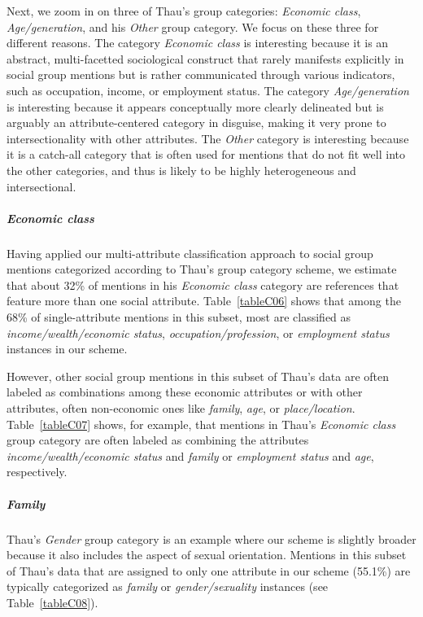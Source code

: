\documentclass[12pt]{article}
\begin{document}
Next, we zoom in on three of Thau's group categories: \emph{Economic class}, \emph{Age/generation}, and his \emph{Other} group category.
We focus on these three for different reasons.
The category \emph{Economic class} is interesting because it is an abstract, multi-facetted sociological construct that rarely manifests explicitly in social group mentions but is rather communicated through various indicators, such as occupation, income, or employment status.
The category \emph{Age/generation} is interesting because it appears conceptually more clearly delineated but is arguably an attribute-centered category in disguise, making it very prone to intersectionality with other attributes.
The \emph{Other} category is interesting because it is a catch-all category that is often used for mentions that do not fit well into the other categories, and thus is likely to be highly heterogeneous and intersectional.

\subparagraph{Economic class}\label{economic-class}

Having applied our multi-attribute classification approach to social group mentions categorized according to Thau's group category scheme, we estimate that about 32\% of mentions in his \emph{Economic class} category are references that feature more than one social attribute.
Table~\ref{tableC06} shows that among the 68\% of single-attribute mentions in this subset, most are classified as \emph{income/wealth/economic status}, \emph{occupation/profession}, or \emph{employment status} instances in our scheme.

%

%

However, other social group mentions in this subset of Thau's data are often labeled as combinations among these economic attributes or with other attributes, often non-economic ones like \emph{family}, \emph{age}, or \emph{place/location}.
Table~\ref{tableC07} shows, for example, that mentions in Thau's \emph{Economic class} group category are often labeled as combining the attributes \emph{income/wealth/economic status} and \emph{family} or \emph{employment status} and \emph{age}, respectively.

\subparagraph{Family}\label{family}

%

Thau's \emph{Gender} group category is an example where our scheme is slightly broader because it also includes the aspect of sexual orientation.
Mentions in this subset of Thau's data that are assigned to only one attribute in our scheme (55.1\%) are typically categorized as \emph{family} or \emph{gender/sexuality} instances (see Table~\ref{tableC08}).
\end{document}
